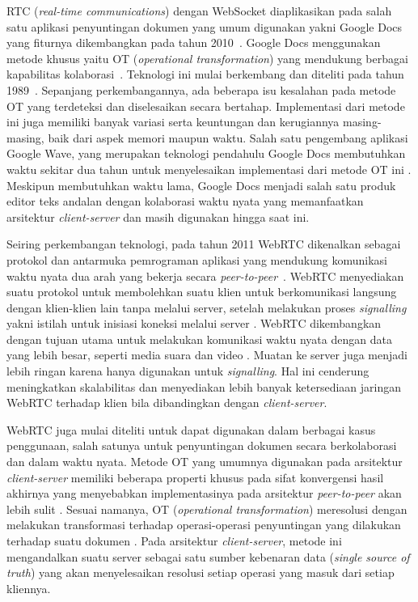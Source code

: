 RTC (\textit{real-time communications}) dengan WebSocket diaplikasikan pada salah satu aplikasi penyuntingan dokumen yang umum digunakan yakni Google Docs yang fiturnya dikembangkan pada tahun 2010~\citep{googledocs1}. Google Docs menggunakan metode khusus yaitu OT (\textit{operational transformation}) yang mendukung berbagai kapabilitas kolaborasi~\citep{googledocs2,googledocs3}. Teknologi ini mulai berkembang dan diteliti pada tahun 1989~\citep{Ellis1989}. Sepanjang perkembangannya, ada beberapa isu kesalahan pada metode OT yang terdeteksi dan diselesaikan secara bertahap. Implementasi dari metode ini juga memiliki banyak variasi serta keuntungan dan kerugiannya masing-masing, baik dari aspek memori maupun waktu. Salah satu pengembang aplikasi Google Wave, yang merupakan teknologi pendahulu Google Docs membutuhkan waktu sekitar dua tahun untuk menyelesaikan implementasi dari metode OT ini \citep{shareJS}. Meskipun membutuhkan waktu lama, Google Docs menjadi salah satu produk editor teks andalan dengan kolaborasi waktu nyata yang memanfaatkan arsitektur \textit{client-server} dan masih digunakan hingga saat ini.

Seiring perkembangan teknologi, pada tahun 2011 WebRTC dikenalkan sebagai protokol dan antarmuka pemrograman aplikasi yang mendukung komunikasi waktu nyata dua arah yang bekerja secara \textit{peer-to-peer}~\citep{dutton2012getting}. WebRTC menyediakan suatu protokol untuk membolehkan suatu klien untuk berkomunikasi langsung dengan klien-klien lain tanpa melalui server, setelah melakukan proses \textit{signalling} yakni istilah untuk inisiasi koneksi melalui server \citep{sredojev2015webrtc}. WebRTC dikembangkan dengan tujuan utama untuk melakukan komunikasi waktu nyata dengan data yang lebih besar, seperti media suara dan video \citep{dutton2012getting}. Muatan ke server juga menjadi lebih ringan karena hanya digunakan untuk \textit{signalling}. Hal ini cenderung meningkatkan skalabilitas dan menyediakan lebih banyak ketersediaan jaringan WebRTC terhadap klien bila dibandingkan dengan \textit{client-server}.

WebRTC juga mulai diteliti untuk dapat digunakan dalam berbagai kasus penggunaan, salah satunya untuk penyuntingan dokumen secara berkolaborasi dan dalam waktu nyata. Metode OT yang umumnya digunakan pada arsitektur \textit{client-server} memiliki beberapa properti khusus pada sifat konvergensi hasil akhirnya yang menyebabkan implementasinya pada arsitektur \textit{peer-to-peer} akan lebih sulit \citep{Sun2017}. Sesuai namanya, OT (\textit{operational transformation}) meresolusi dengan melakukan transformasi terhadap operasi-operasi penyuntingan yang dilakukan terhadap suatu dokumen \citep{OTOverview1}. Pada arsitektur \textit{client-server}, metode ini mengandalkan suatu server sebagai satu sumber kebenaran data (\textit{single source of truth}) yang akan menyelesaikan resolusi setiap operasi yang masuk dari setiap kliennya.

